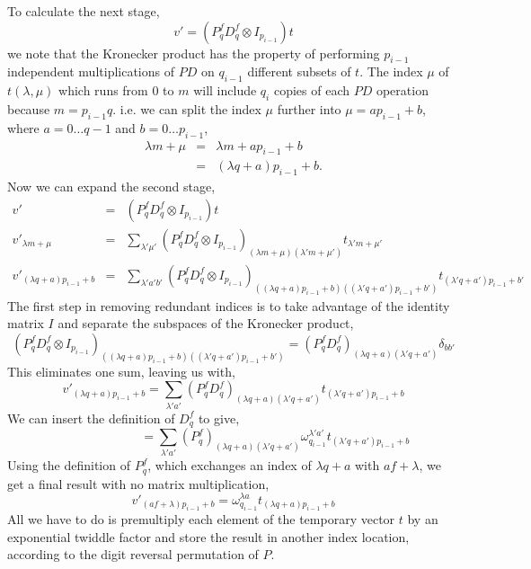 \documentclass[fleqn,12pt]{article}
\begin{document}
To calculate the next stage,
%
\begin{equation}
v'=(P^f_q D^f_q \otimes I_{p_{i-1}}) t
\end{equation}
%
we note that the Kronecker product has the property of performing
$p_{i-1}$ independent multiplications of $PD$ on $q_{i-1}$ different
subsets of $t$. The index $\mu$ of $t(\lambda,\mu)$ which runs from 0
to $m$ will include $q_i$ copies of each $PD$ operation because
$m=p_{i-1}q$. i.e. we can split the index $\mu$ further into $\mu = a
p_{i-1} + b$, where $a = 0 \dots q-1$ and $b=0 \dots p_{i-1}$,
%
\begin{eqnarray}
\lambda m + \mu &=& \lambda m + a p_{i-1} + b \\
        &=& (\lambda q + a) p_{i-1} + b.
\end{eqnarray}
%
Now we can expand the second stage,
%
\begin{eqnarray}
v'&=& (P^f_q D^f_q \otimes I_{p_{i-1}}) t \\
v'_{\lambda m + \mu} &=& \sum_{\lambda' \mu'} 
 (P^f_q D^f_q \otimes I_{p_{i-1}})_{(\lambda m + \mu)(\lambda' m + \mu')}
        t_{\lambda' m + \mu'} \\
v'_{(\lambda q + a) p_{i-1} + b} &=& \sum_{\lambda' a' b'}
(
P^f_q D^f_q \otimes I_{p_{i-1}}
)_{((\lambda q+ a)p_{i-1} + b)((\lambda' q+ a')p_{i-1} + b')} 
t_{(\lambda' q + a')p_{i-1} +b'} 
\end{eqnarray}
%
The first step in removing redundant indices is to take advantage of
the identity matrix $I$ and separate the subspaces of the Kronecker
product,
%
\begin{equation}
(
P^f_q D^f_q \otimes I_{p_{i-1}}
)_{((\lambda q+ a)p_{i-1} + b)((\lambda' q+ a')p_{i-1} + b')} 
=
(P^f_q D^f_q)_{(\lambda q + a)(\lambda' q + a')}
\delta_{bb'}
\end{equation}
%
This eliminates one sum, leaving us with,
%
\begin{equation}
v'_{(\lambda q + a) p_{i-1} + b} 
= 
\sum_{\lambda' a' }
(P^f_q D^f_q)_{(\lambda q + a)(\lambda' q + a')} t_{(\lambda'q+a')p_{i-1} + b}
\end{equation}
%
We can insert the definition of $D^f_q$ to give,
%
\begin{equation}
\phantom{v'_{(\lambda q + a) p_{i-1} + b}}
= \sum_{\lambda'a'} (P^f_q)_{(\lambda q + a)(\lambda'q + a')} 
\omega^{\lambda'a'}_{q_{i-1}} t_{(\lambda'q+a')p_{i-1}+b}
\end{equation}
%
Using the definition of $P^f_q$, which exchanges an index of $\lambda
q + a$ with $a f + \lambda$, we get a final result with no matrix
multiplication,
%
\begin{equation}
v'_{(a f + \lambda) p_{i-1} + b}
= \omega^{\lambda a}_{q_{i-1}} t_{(\lambda q + a)p_{i-1} + b}
\end{equation}
%
All we have to do is premultiply each element of the temporary vector
$t$ by an exponential twiddle factor and store the result in another
index location, according to the digit reversal permutation of $P$.
\end{document}
